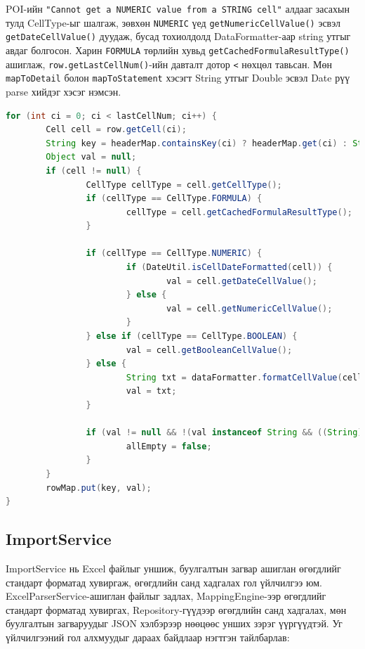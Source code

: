 \quad \quad POI-ийн \verb|"Cannot get a NUMERIC value from a STRING cell"| алдааг засахын тулд CellType-ыг шалгаж, зөвхөн \verb|NUMERIC| үед \verb|getNumericCellValue()| эсвэл \verb|getDateCellValue()| дуудаж, бусад тохиолдолд DataFormatter-аар string утгыг авдаг болгосон. Харин \verb|FORMULA| төрлийн хувьд \verb|getCachedFormulaResultType()| ашиглаж, \verb|row.getLastCellNum()|-ийн давталт дотор \verb|<| нөхцөл тавьсан. Мөн \verb|mapToDetail| болон \verb|mapToStatement| хэсэгт String утгыг Double эсвэл Date рүү parse хийдэг хэсэг нэмсэн.\\
\begin{lstlisting}[language=Java, caption=Excel файлаас DataFormatter ашиглан өгөгдлийг шүүж авах, frame=single]
for (int ci = 0; ci < lastCellNum; ci++) {
		Cell cell = row.getCell(ci);
		String key = headerMap.containsKey(ci) ? headerMap.get(ci) : String.valueOf(ci);
		Object val = null;
		if (cell != null) {
				CellType cellType = cell.getCellType();
				if (cellType == CellType.FORMULA) {
						cellType = cell.getCachedFormulaResultType();
				}

				if (cellType == CellType.NUMERIC) {
						if (DateUtil.isCellDateFormatted(cell)) {
								val = cell.getDateCellValue();
						} else {
								val = cell.getNumericCellValue();
						}
				} else if (cellType == CellType.BOOLEAN) {
						val = cell.getBooleanCellValue();
				} else {
						String txt = dataFormatter.formatCellValue(cell).trim();
						val = txt;
				}

				if (val != null && !(val instanceof String && ((String) val).isEmpty())) {
						allEmpty = false;
				}
		}
		rowMap.put(key, val);
}
\end{lstlisting}


\subsection{ImportService}

ImportService нь Excel файлыг уншиж, буулгалтын загвар ашиглан өгөгдлийг стандарт форматад хувиргаж, өгөгдлийн санд хадгалах гол үйлчилгээ юм. ExcelParserService-ашиглан файлыг задлах, MappingEngine-ээр өгөгдлийг стандарт форматад хувиргах, Repository-гүүдээр өгөгдлийн санд хадгалах, мөн буулгалтын загваруудыг JSON хэлбэрээр нөөцөөс унших зэрэг үүргүүдтэй. Уг үйлчилгээний гол алхмуудыг дараах байдлаар нэгтгэн тайлбарлав:

